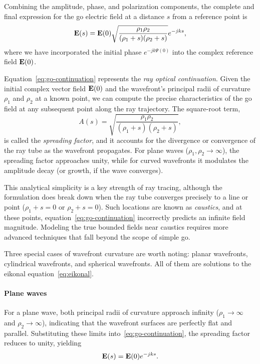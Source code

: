 Combining the amplitude, phase, and polarization components, the complete and final expression for the \gls{go} electric field at a distance $s$ from a reference point is
\begin{equation}\label{eq:go-continuation}
  \mathbf{E}(s) = \mathbf{E}(0) \sqrt{\frac{\rho_1 \rho_2}{(\rho_1 + s)(\rho_2 + s)}} e^{-jks},
\end{equation}
where we have incorporated the initial phase $e^{-jk\Psi(0)}$ into the complex reference field $\mathbf{E}(0)$.

Equation~\eqref{eq:go-continuation} represents the \emph{ray optical continuation}. Given the initial complex vector field $\mathbf{E}(0)$ and the wavefront's principal radii of curvature $\rho_1$ and $\rho_2$ at a known point, we can compute the precise characteristics of the \gls{go} field at any subsequent point along the ray trajectory. The square-root term,
\begin{equation}\label{eq:spreading-factor}
  A(s) = \sqrt{\frac{\rho_1 \rho_2}{(\rho_1 + s)(\rho_2 + s)}},
\end{equation}
is called the \emph{spreading factor}, and it accounts for the divergence or convergence of the ray tube as the wavefront propagates. For plane waves ($\rho_1,\rho_2 \to \infty$), the spreading factor approaches unity, while for curved wavefronts it modulates the amplitude decay (or growth, if the wave converges).

This analytical simplicity is a key strength of ray tracing, although the formulation does break down when the ray tube converges precisely to a line or point ($\rho_1 + s = 0$ or $\rho_2 + s = 0$). Such locations are known as \emph{caustics}, and at these points, equation~\eqref{eq:go-continuation} incorrectly predicts an infinite field magnitude. Modeling the true bounded fields near caustics requires more advanced techniques that fall beyond the scope of simple \gls{go}.

Three special cases of wavefront curvature are worth noting: planar wavefronts, cylindrical wavefronts, and spherical wavefronts. All of them are solutions to the eikonal equation~\eqref{eq:eikonal}.

\paragraph{Plane waves}

For a plane wave, both principal radii of curvature approach infinity ($\rho_1 \to \infty$ and $\rho_2 \to \infty$), indicating that the wavefront surfaces are perfectly flat and parallel. Substituting these limits into~\eqref{eq:go-continuation}, the spreading factor reduces to unity, yielding
\begin{equation}
  \mathbf{E}(s) = \mathbf{E}(0) e^{-jks}.
\end{equation}

